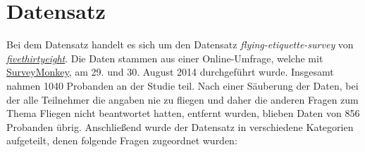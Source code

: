 \documentclass{mi-seminar}
\begin{document}
\section{Datensatz} \label{Datensatz}
Bei dem Datensatz handelt es sich um den Datensatz \textit{flying-etiquette-survey} von \textit{\href{https://github.com/fivethirtyeight/data/tree/master/flying-etiquette-survey}{fivethirtyeight}}. Die Daten stammen aus einer Online-Umfrage, welche mit \href{https://www.surveymonkey.com/mp/audience/}{SurveyMonkey}, am 29. und 30. August 2014 durchgeführt wurde. Insgesamt nahmen 1040 Probanden an der Studie teil. Nach einer Säuberung der Daten, bei der alle Teilnehmer die angaben nie zu fliegen und daher die anderen Fragen zum Thema Fliegen nicht beantwortet hatten, entfernt wurden, blieben Daten von 856 Probanden übrig. 
\newline \newline
Anschließend wurde der Datensatz in verschiedene Kategorien aufgeteilt, denen folgende Fragen zugeordnet wurden:
\end{document}

